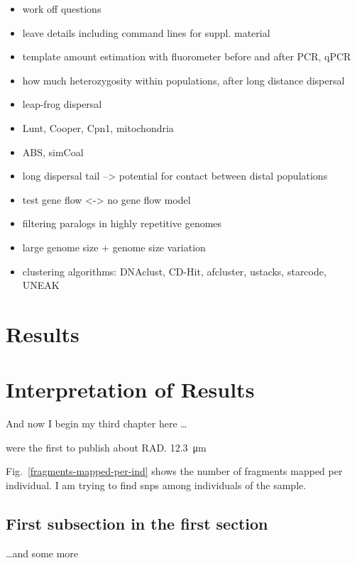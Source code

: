 \documentclass[a4paper,12pt,times,print,index, custombib]{PhDThesisPSnPDF}\usepackage[]{graphicx}\usepackage[]{color}
\begin{document}
\begin{itemize}
\item work off questions
\item leave details including command lines for suppl. material
\item template amount estimation with fluorometer before and after PCR, qPCR
\item how much heterozygosity within populations, after long distance dispersal
\item leap-frog dispersal
\item Lunt, Cooper, Cpn1, mitochondria
\item ABS, simCoal
\item long dispersal tail --> potential for contact between distal populations
\item test gene flow <-> no gene flow model
\item filtering paralogs in highly repetitive genomes
\item large genome size $+$ genome size variation
\item clustering algorithms: DNAclust, CD-Hit, afcluster, ustacks, starcode, UNEAK
\end{itemize}


\section{Results}

\section{Interpretation of Results}



And now I begin my third chapter here \dots

\cite{Baird2008} were the first to publish about RAD. \SI{12,3}{\micro\metre}

Fig.~\vref{fragments-mapped-per-ind} shows the number of \glspl{fragment} mapped per individual.
I am trying to find \glspl{snp} among individuals of the sample.







\subsection{First subsection in the first section}
\dots and some more 
\end{document}
